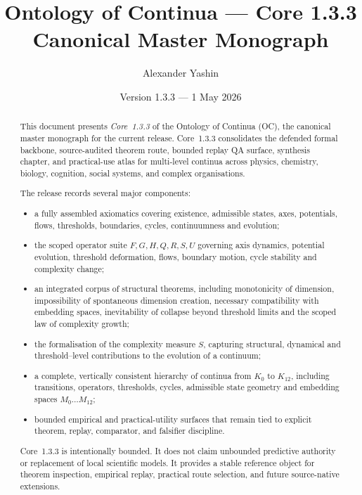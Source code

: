 
\title{Ontology of Continua --- Core 1.3.3 Canonical Master Monograph}
\author{Alexander Yashin}
\date{Version 1.3.3 --- 1 May 2026}

\maketitle

\begin{abstract}
This document presents \emph{Core~1.3.3} of the Ontology of Continua (OC), the
canonical master monograph for the current release. Core~1.3.3 consolidates the
defended formal backbone, source-audited theorem route, bounded replay QA surface, synthesis chapter, and practical-use atlas for multi-level continua
across physics, chemistry, biology, cognition, social systems, and complex
organisations.

The release records several major components:
\begin{itemize}
    \item a fully assembled axiomatics covering existence, admissible states,
          axes, potentials, flows, thresholds, boundaries, cycles, continuumness
          and evolution;
    \item the scoped operator suite \(F, G, H, Q, R, S, U\) governing axis
          dynamics, potential evolution, threshold deformation, flows, boundary
          motion, cycle stability and complexity change;
    \item an integrated corpus of structural theorems, including monotonicity
          of dimension, impossibility of spontaneous dimension creation,
          necessary compatibility with embedding spaces, inevitability of
          collapse beyond threshold limits and the scoped law of complexity
          growth;
    \item the formalisation of the complexity measure \(S\), capturing structural,
          dynamical and threshold--level contributions to the evolution of a
          continuum;
    \item a complete, vertically consistent hierarchy of continua from \(K_0\)
          to \(K_{12}\), including transitions, operators, thresholds, cycles,
          admissible state geometry and embedding spaces \(M_0 \dots M_{12}\);
    \item bounded empirical and practical-utility surfaces that remain tied to
          explicit theorem, replay, comparator, and falsifier discipline.
\end{itemize}

Core~1.3.3 is intentionally bounded. It does not claim unbounded predictive authority
or replacement of local scientific models. It provides a stable reference
object for theorem inspection, empirical replay, practical route selection, and
future source-native extensions.
\end{abstract}

\tableofcontents
\clearpage
